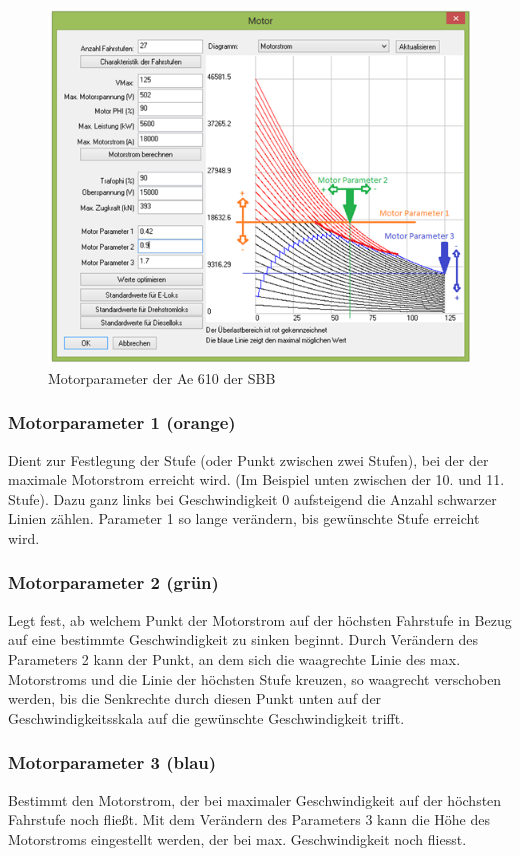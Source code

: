 \begin{figure}
\centering
\includegraphics[width=1.0\textwidth]{editor/images/motorparameter.png}
\caption{Motorparameter der Ae 610 der SBB}
\label{fig:editor:motorparameter}
\end{figure}

\subsubsection{Motorparameter 1 (orange)}
Dient zur Festlegung der Stufe (oder Punkt zwischen zwei Stufen), bei der der maximale Motorstrom erreicht wird. (Im Beispiel unten zwischen der 10. und 11. Stufe).
Dazu ganz links bei Geschwindigkeit 0 aufsteigend die Anzahl schwarzer Linien zählen. Parameter 1 so lange verändern, bis gewünschte Stufe erreicht wird.

\subsubsection{Motorparameter 2 (grün)}
Legt fest, ab welchem Punkt der Motorstrom auf der höchsten Fahrstufe in Bezug auf eine bestimmte Geschwindigkeit zu sinken beginnt.
Durch Verändern des Parameters 2 kann der Punkt, an dem sich die waagrechte Linie des max. Motorstroms und die Linie der höchsten Stufe kreuzen, so waagrecht verschoben werden, bis die Senkrechte durch diesen Punkt unten auf der Geschwindigkeitsskala auf die gewünschte Geschwindigkeit trifft.

\subsubsection{Motorparameter 3 (blau)}
Bestimmt den Motorstrom, der bei maximaler Geschwindigkeit auf der höchsten Fahrstufe noch fließt.
Mit dem Verändern des Parameters 3 kann die Höhe des Motorstroms eingestellt werden, der bei max. Geschwindigkeit noch fliesst.

